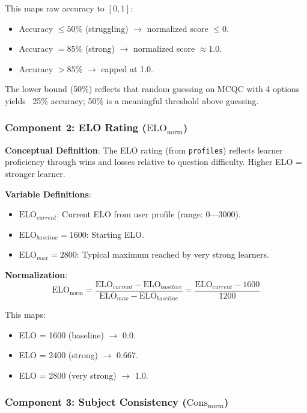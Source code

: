 \documentclass[sigconf,authordraft,twoside]{acmart}
\newcommand{\tech}[1]{\textcolor{brandblue}{\nolinkurl{#1}}}
\begin{document}
This maps raw accuracy to $[0, 1]$:
\begin{itemize}
\item Accuracy $\leq 50\%$ (struggling) $\to$ normalized score $\leq 0$.
\item Accuracy $= 85\%$ (strong) $\to$ normalized score $\approx 1.0$.
\item Accuracy $> 85\%$ $\to$ capped at 1.0.
\end{itemize}

The lower bound (50\%) reflects that random guessing on MCQC with 4 options yields ~25\% accuracy; 50\% is a meaningful threshold above guessing.

\subsubsection{Component 2: ELO Rating ($\text{ELO}_{\text{norm}}$)}

\textbf{Conceptual Definition}:
The ELO rating (from \tech{profiles}) reflects learner proficiency through wins and losses relative to question difficulty. Higher ELO = stronger learner.

\textbf{Variable Definitions}:
\begin{itemize}
\item $\text{ELO}_{current}$: Current ELO from user profile (range: 0—3000).
\item $\text{ELO}_{baseline} = 1600$: Starting ELO.
\item $\text{ELO}_{max} = 2800$: Typical maximum reached by very strong learners.
\end{itemize}

\textbf{Normalization}:
\begin{equation}
\text{ELO}_{\text{norm}} = \frac{\text{ELO}_{current} - \text{ELO}_{baseline}}{\text{ELO}_{max} - \text{ELO}_{baseline}} = \frac{\text{ELO}_{current} - 1600}{1200}
\end{equation}

This maps:
\begin{itemize}
\item ELO = 1600 (baseline) $\to$ 0.0.
\item ELO = 2400 (strong) $\to$ 0.667.
\item ELO = 2800 (very strong) $\to$ 1.0.
\end{itemize}

\subsubsection{Component 3: Subject Consistency ($\text{Cons}_{\text{norm}}$)}
\end{document}

